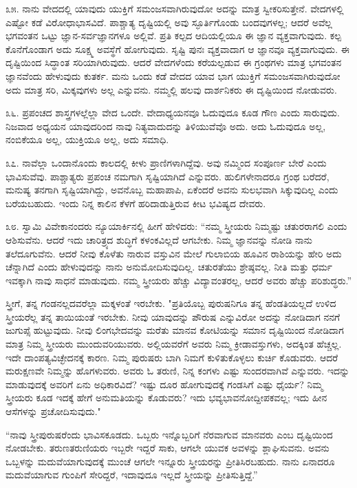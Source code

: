 ೩೫. ನಾನು ವೇದದಲ್ಲಿ ಯಾವುದು ಯುಕ್ತಿಗೆ ಸಮಂಜಸವಾಗಿರುವುದೋ ಅದನ್ನು ಮಾತ್ರ ಸ್ವೀಕರಿಸುತ್ತೇನೆ. ವೇದಗಳಲ್ಲಿ ಎಷ್ಟೋ ಕಡೆ ವಿರೋಧಾಭಾಸವಿದೆ. ಪಾಶ್ಚಾತ್ಯ ದೃಷ್ಟಿಯಲ್ಲಿ ಅವು ಸ್ಫೂರ್ತಿಗೊಂಡು ಬಂದವುಗಳಲ್ಲ; ಆದರೆ ಅವೆಲ್ಲ ಭಗವಂತನ ಒಟ್ಟು ಜ್ಞಾನ-ಸರ್ವಜ್ಞಾನಗಳೂ ಅಲ್ಲಿವೆ. ಪ್ರತಿ ಕಲ್ಪದ ಆದಿಯಲ್ಲಿಯೂ ಈ ಜ್ಞಾನ ವ್ಯಕ್ತವಾಗುವುದು. ಕಲ್ಪ ಕೊನೆಗೊಂಡಾಗ ಅದು ಸೂಕ್ಷ್ಮ ಅವಸ್ಥೆಗೆ ಹೋಗುವುದು. ಸೃಷ್ಟಿ ಪುನಃ ವ್ಯಕ್ತವಾದಾಗ ಆ ಜ್ಞಾನವೂ ವ್ಯಕ್ತವಾಗುವುದು. ಈ ದೃಷ್ಟಿಯಿಂದ ಸಿದ್ಧಾಂತ ಸರಿಯಾಗಿರುವುದು. ಆದರೆ ವೇದಗಳೆಂದು ಕರೆಯಲ್ಪಡುವ ಈ ಗ್ರಂಥಗಳು ಮಾತ್ರ ಭಗವಂತನ ಜ್ಞಾನವೆಂದು ಹೇಳುವುದು ಕುತರ್ಕ. ಮನು ಒಂದು ಕಡೆ ವೇದದ ಯಾವ ಭಾಗ ಯುಕ್ತಿಗೆ ಸಮಂಜಸವಾಗಿರುವುದೋ ಅದು ಮಾತ್ರ ಸರಿ, ಮಿಕ್ಕವುಗಳು ಅಲ್ಲ ಎನ್ನುವನು. ನಮ್ಮಲ್ಲಿ ಹಲವು ದಾರ್ಶನಿಕರು ಈ ದೃಷ್ಟಿಯಿಂದ ನೋಡುವರು.

೩೬. ಪ್ರಪಂಚದ ಶಾಸ್ತ್ರಗಳಲ್ಲೆಲ್ಲಾ ವೇದ ಒಂದೇ. ವೇದಾಧ್ಯಯನವೂ ಓದುವುದೂ ಕೂಡ ಗೌಣ ಎಂದು ಸಾರುವುದು. ನಿಜವಾದ ಅಧ್ಯಯನ ಯಾವುದರಿಂದ ನಾವು ನಿತ್ಯವಾದುದನ್ನು ತಿಳಿಯುವೆವೊ ಅದು. ಅದು ಓದುವುದೂ ಅಲ್ಲ, ನಂಬಿಕೆಯೂ ಅಲ್ಲ, ಯುಕ್ತಿಯೂ ಅಲ್ಲ, ಅದು ಸಮಾಧಿ.

೩೭. ನಾವೆಲ್ಲಾ ಒಂದಾನೊಂದು ಕಾಲದಲ್ಲಿ ಕೀಳು ಪ್ರಾಣಿಗಳಾಗಿದ್ದೆವು. ಅವು ನಮ್ಮಿಂದ ಸಂಪೂರ್ಣ ಬೇರೆ ಎಂದು ಭಾವಿಸುವೆವು. ಪಾಶ್ಚಾತ್ಯರು ಪ್ರಪಂಚ ನಮಗಾಗಿ ಸೃಷ್ಟಿಯಾಗಿದೆ ಎನ್ನುವರು. ಹುಲಿಗಳೇನಾದರೂ ಗ್ರಂಥ ಬರೆದರೆ, ಮನುಷ್ಯ ತನಗಾಗಿ ಸೃಷ್ಟಿಯಾಗಿದ್ದು, ಅವನೊಬ್ಬ ಮಹಾಪಾಪಿ, ಏಕೆಂದರೆ ಅವನು ಸುಲಭವಾಗಿ ಸಿಕ್ಕುವುದಿಲ್ಲ ಎಂದು ಬರೆಯಬಹುದು. ಇಂದು ನಿನ್ನ ಕಾಲಿನ ಕೆಳಗೆ ಹರಿದಾಡುತ್ತಿರುವ ಕೀಟ ಭವಿಷ್ಯದ ದೇವರು.

೩೮. ಸ್ವಾಮಿ ವಿವೇಕಾನಂದರು ನ್ಯೂಯಾರ್ಕಿನಲ್ಲಿ ಹೀಗೆ ಹೇಳಿದರು: “ನಮ್ಮ ಸ್ತ್ರೀಯರು ನಿಮ್ಮಷ್ಟು ಚತುರರಾಗಲಿ ಎಂದು ಆಶಿಸುವೆನು. ಆದರೆ ಇದು ಚಾರಿತ್ರ್ಯದ ಶುದ್ಧಿಗೆ ಕಳಂಕವಿಲ್ಲದೆ ಆಗಬೇಕು. ನಿಮ್ಮ ಜ್ಞಾನವನ್ನು ನೋಡಿ ನಾನು ತಲೆದೂಗುವೆನು. ಆದರೆ ನೀವು ಕೊಳೆತು ನಾರುವ ವಸ್ತುವಿನ ಮೇಲೆ ಗುಲಾಬಿಯ ಹೂವಿನ ರಾಶಿಯನ್ನು ಹೇರಿ ಅದು ಚೆನ್ನಾಗಿದೆ ಎಂದು ಹೇಳುವುದನ್ನು ನಾನು ಅನುಮೋದಿಸುವುದಿಲ್ಲ. ಚತುರತೆಯು ಶ್ರೇಷ್ಠವಲ್ಲ. ನೀತಿ ಮತ್ತು ಧರ್ಮ ಇವಕ್ಕಾಗಿ ನಾವು ಸಾಧನೆ ಮಾಡುವುದು. ನಮ್ಮ ಸ್ತ್ರೀಯರು ಹೆಚ್ಚು ವಿದ್ಯಾವಂತರಲ್ಲ, ಆದರೆ ಅವರು ಹೆಚ್ಚು ಪರಿಶುದ್ಧರು.”

ಸ್ತ್ರೀಗೆ, ತನ್ನ ಗಂಡನಲ್ಲದವರೆಲ್ಲಾ ಮಕ್ಕಳಂತೆ ಇರಬೇಕು. "ಪ್ರತಿಯೊಬ್ಬ ಪುರುಷನಿಗೂ ತನ್ನ ಹೆಂಡತಿಯಲ್ಲದೆ ಉಳಿದ ಸ್ತ್ರೀಯರೆಲ್ಲ ತನ್ನ ತಾಯಿಯಂತೆ ಇರಬೇಕು. ನೀವು ಯಾವುದನ್ನು ಪೌರುಷ  ಎನ್ನುವಿರೋ ಅದನ್ನು ನೋಡಿದಾಗ ನನಗೆ ಜುಗುಪ್ಸೆ ಹುಟ್ಟುವುದು. ನೀವು ಲಿಂಗಭೇದವನ್ನು ಮರೆತು ಮಾನವ ಕೋಟಿಯನ್ನು ಸಮಾನ ದೃಷ್ಟಿಯಿಂದ ನೋಡಿದಾಗ ಮಾತ್ರ ನಿಮ್ಮ ಸ್ತ್ರೀಯರು ಮುಂದುವರಿಯುವರು. ಅಲ್ಲಿಯವರೆಗೆ ಅವರು ನಿಮ್ಮ ಕ್ರೀಡಾವಸ್ತುಗಳು, ಅದಕ್ಕಿಂತ ಹೆಚ್ಚಲ್ಲ. ಇದೇ ದಾಂಪತ್ಯವಿಚ್ಛೇದನಕ್ಕೆ ಕಾರಣ. ನಿಮ್ಮ ಪುರುಷರು ಬಾಗಿ ನಿಮಗೆ ಕುಳಿತುಕೊಳ್ಳಲು ಕುರ್ಚಿ ಕೊಡುವರು. ಆದರೆ ಮರುಕ್ಷಣವೇ ನಿಮ್ಮನ್ನು ಹೊಗಳುವರು. ಅವರು ಓ ತರುಣಿ, ನಿನ್ನ ಕಂಗಳು ಎಷ್ಟು ಸುಂದರವಾಗಿವೆ ಎನ್ನುವರು. ಇದನ್ನು ಮಾಡುವುದಕ್ಕೆ ಅವರಿಗೆ ಏನು ಅಧಿಕಾರವಿದೆ? ಇಷ್ಟು ದೂರ ಹೋಗುವುದಕ್ಕೆ ಗಂಡಸಿಗೆ ಎಷ್ಟು ಧೈರ್ಯ? ನಿಮ್ಮ ಸ್ತ್ರೀಯರು ಕೂಡ ಇದಕ್ಕೆ ಹೇಗೆ ಅನುಮತಿಯನ್ನು ಕೊಡುವರು? ಇದು ಭವ್ಯಭಾವನೋದ್ದೀಪಕವಲ್ಲ; ಇದು ಹೀನ ಆಸೆಗಳನ್ನು ಪ್ರಚೋದಿಸುವುದು."

“ನಾವು ಸ್ತ್ರೀಪುರುಷರೆಂದು ಭಾವಿಸಕೂಡದು. ಒಬ್ಬರು ಇನ್ನೊಬ್ಬರಿಗೆ ನೆರವಾಗುವ ಮಾನವರು ಎಂಬ ದೃಷ್ಟಿಯಿಂದ ನೋಡಬೇಕು. ತರುಣತರುಣಿಯರು ಇಬ್ಬರೇ ಇದ್ದರೆ ಸಾಕು, ಆಗಲೇ ಯುವಕ ಅವಳನ್ನು ಶ್ಲಾಘಿಸುವನು. ಅವನು ಒಬ್ಬಳನ್ನು ಮದುವೆಯಾಗುವುದಕ್ಕೆ ಮುಂಚೆ ಆಗಲೇ ಇನ್ನೂರು ಸ್ತ್ರೀಯರನ್ನು ಪ್ರೀತಿಸಿರಬಹುದು. ನಾನು ಏನಾದರೂ ಮದುವೆಯಾಗುವ ಗುಂಪಿಗೆ ಸೇರಿದ್ದರೆ, ಇದಾವುದೂ ಇಲ್ಲದೆ ಸ್ತ್ರೀಯನ್ನು ಪ್ರೀತಿಸುತ್ತಿದ್ದೆ.”

